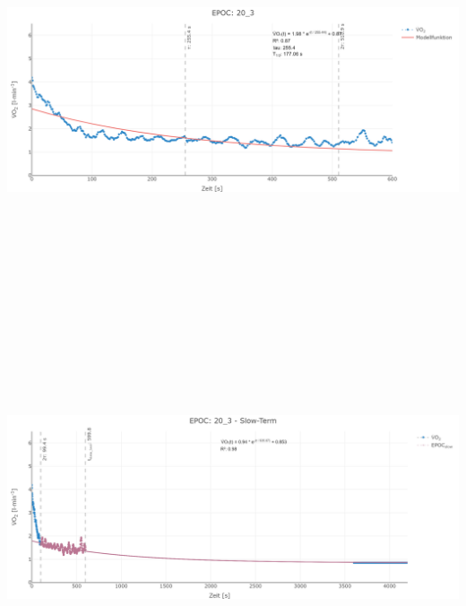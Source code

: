 \documentclass[
  letterpaper,
  DIV=11]{scrartcl}
\begin{document}
\includegraphics[width=11.45833in,height=4.6875in]{images/20_3_tau.png}
\includegraphics[width=11.45833in,height=4.6875in]{images/20_3_slow.png}
\end{document}
